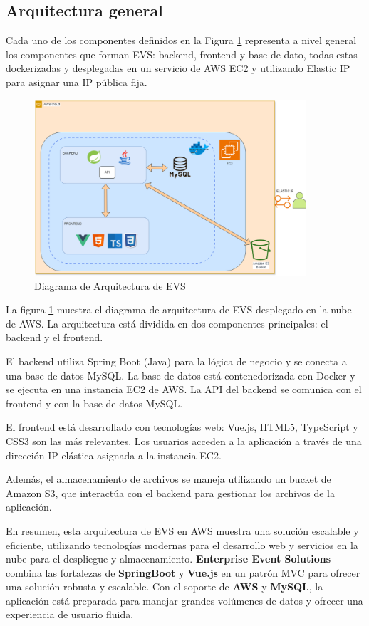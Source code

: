 \subsection{Arquitectura general}
Cada uno de los componentes definidos en la Figura \ref{fig:mvc_architecture} representa a nivel general los componentes que forman EVS: backend, frontend y base de dato, todas
estas dockerizadas y desplegadas en un servicio de AWS EC2 y utilizando Elastic IP para asignar una IP pública fija.

\begin{figure}[h]
    \centering
    \includegraphics[width=0.9\textwidth]{Aquitectura1.png} 
    \caption{Diagrama de Arquitectura de EVS}
    \label{fig:mvc_architecture}
\end{figure}

La figura \ref{fig:mvc_architecture} muestra el diagrama de arquitectura de EVS desplegado en la nube de AWS. La arquitectura está dividida en dos componentes principales: el backend y el frontend.

El backend utiliza Spring Boot (Java) para la lógica de negocio y se conecta a una base de datos MySQL. La base de datos está contenedorizada con Docker y se ejecuta en una
instancia EC2 de AWS. La API del backend se comunica con el frontend y con la base de datos MySQL.

El frontend está desarrollado con tecnologías web: Vue.js, HTML5, TypeScript y CSS3 son las más relevantes. Los usuarios acceden a la aplicación a través de una dirección 
IP elástica asignada a la instancia EC2.

Además, el almacenamiento de archivos se maneja utilizando un bucket de Amazon S3, que interactúa con el backend para gestionar los archivos de la aplicación.

En resumen, esta arquitectura de EVS en AWS muestra una solución escalable y eficiente, utilizando tecnologías modernas para el desarrollo web y servicios en la nube para el despliegue y almacenamiento. 
\textbf{Enterprise Event Solutions} combina las fortalezas de \textbf{SpringBoot} y \textbf{Vue.js} en un patrón MVC para ofrecer una solución robusta y 
escalable. Con el soporte de \textbf{AWS} y \textbf{MySQL}, la aplicación está preparada para manejar grandes volúmenes de datos y ofrecer una experiencia 
de usuario fluida.

